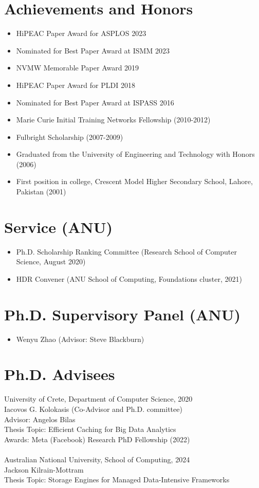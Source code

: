 \documentclass[singlecolumn,singlespace,11pt]{article}
\begin{document}
\section*{Achievements and Honors}
\begin{itemize}
\item HiPEAC Paper Award for ASPLOS 2023
\item Nominated for Best Paper Award at ISMM 2023
\item NVMW Memorable Paper Award 2019
\item HiPEAC Paper Award for PLDI 2018 
\item Nominated for Best Paper Award at ISPASS 2016 
\item Marie Curie Initial Training Networks Fellowship (2010-2012)
\item Fulbright Scholarship (2007-2009)
\item Graduated from the University of Engineering and Technology with Honors (2006)
\item First position in college, Crescent Model Higher Secondary School, Lahore, Pakistan (2001)
\end{itemize}

\section*{Service (ANU)}

\begin{itemize}
\item Ph.D. Scholarship Ranking Committee (Research School of Computer Science, August 2020)
\item HDR Convener (ANU School of Computing, Foundations cluster, 2021)
\end{itemize}

\section*{Ph.D. Supervisory Panel (ANU)}

\begin{itemize}
\item Wenyu Zhao (Advisor: Steve Blackburn)
\end{itemize}

\section*{Ph.D. Advisees}
University of Crete, Department of Computer Science, 2020 \\
\indent Iacovos G. Kolokasis (Co-Advisor and Ph.D. committee) \\
\indent Advisor: Angelos Bilas \\ 
\indent Thesis Topic: Efficient Caching for Big Data Analytics \\ 
\indent Awards: Meta (Facebook) Research PhD Fellowship (2022)
\\
\\
Australian National University, School of Computing, 2024\\
\indent Jackson Kilrain-Mottram \\
\indent Thesis Topic: Storage Engines for Managed Data-Intensive Frameworks
\end{document}
